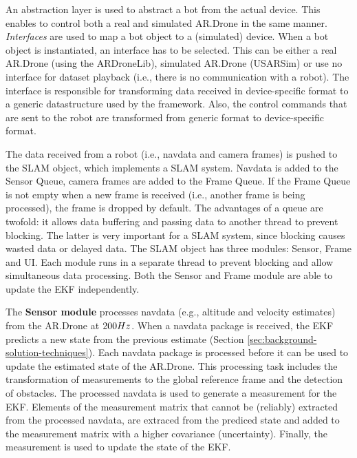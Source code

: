 An abstraction layer is used to abstract a bot from the actual device.
This enables to control both a real and simulated AR.Drone in the same manner.
\textit{Interfaces} are used to map a bot object to a (simulated) device.
When a bot object is instantiated, an interface has to be selected.
This can be either a real AR.Drone (using the ARDroneLib), simulated AR.Drone (USARSim) or use no interface for dataset playback (i.e., there is no communication with a robot).
The interface is responsible for transforming data received in device-specific format to a generic datastructure used by the framework.
Also, the control commands that are sent to the robot are transformed from generic format to device-specific format.

The data received from a robot (i.e., navdata and camera frames) is pushed to the SLAM object, which implements a SLAM system.
Navdata is added to the Sensor Queue, camera frames are added to the Frame Queue.
If the Frame Queue is not empty when a new frame is received (i.e., another frame is being processed), the frame is dropped by default.
The advantages of a queue are twofold: it allows data buffering and passing data to another thread to prevent blocking.
The latter is very important for a SLAM system, since blocking causes wasted data or delayed data.
The SLAM object has three modules: Sensor, Frame and UI.
Each module runs in a separate thread to prevent blocking and allow simultaneous data processing.
Both the Sensor and Frame module are able to update the EKF independently.

The \textbf{Sensor module} processes navdata (e.g., altitude and velocity estimates) from the AR.Drone at $200 \small{Hz}$.
When a navdata package is received, the EKF predicts a new state from the previous estimate (Section \ref{sec:background-solution-techniques}).
Each navdata package is processed before it can be used to update the estimated state of the AR.Drone.
This processing task includes the transformation of measurements to the global reference frame and the detection of obstacles.
The processed navdata is used to generate a measurement for the EKF.
Elements of the measurement matrix that cannot be (reliably) extracted from the processed navdata, are extraced from the prediced state and added to the measurement matrix with a higher covariance (uncertainty).
Finally, the measurement is used to update the state of the EKF.


